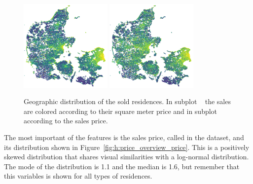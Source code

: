 \documentclass[a4paper, twoside, nobib]{tufte-book}
\newcommand{\code}[1]{\colorbox{light-gray}{\texttt{\detokenize{#1}}}}
\begin{document}
\begin{figure}
  \centering
  \subfloat[\label{fig:h:geo_overview_sqm_price}]{\qquad}
  \includegraphics[draft, width=0.4\textwidth]{figures/housing/Denmark_Overview_SqmPrice.png}\hfil
  \subfloat[\label{fig:h:geo_overview_sales_price}]{\qquad}
  \includegraphics[draft, width=0.4\textwidth]{figures/housing/Denmark_Overview_SalesPrice.png}
  \caption[Distributions for the housing price dataset]{Geographic distribution of the sold residences. 
           In subplot ~\protect{} the sales are colored according to their square meter price and in subplot ~\protect{} according to the sales price. 
           }
  \label{fig:h:geo_overview}
  \vspace{\abovecaptionskip}
\end{figure}


The most important of the features is the sales price, called \code{SalgsPris} in the dataset, and its distribution shown in Figure~\ref{fig:h:price_overview_price}. This is a positively skewed distribution that shares visual similarities with a log-normal distribution. The mode of the distribution is \SI{1.1}{\Mkr} and the median is \SI{1.6}{\Mkr}, but remember that this variables is shown for all types of residences.  
\end{document}
